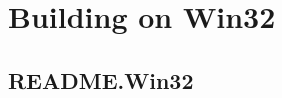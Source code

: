 \section{Building on Win32}
\label{group__win32}
\subsection{README.Win32}\label{group__win32_win32}


\begin{DocInclude}\begin{verbatim}\end{verbatim}
\end{DocInclude}
 